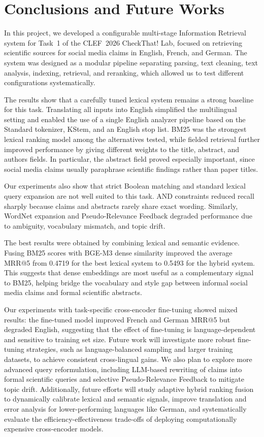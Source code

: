 \section{Conclusions and Future Works}

\label{sec:conclusion}

    In this project, we developed a configurable multi-stage Information Retrieval system for Task~1 of the CLEF~2026 CheckThat! Lab, focused on retrieving scientific sources for social media claims in English, French, and German. The system was designed as a modular pipeline separating parsing, text cleaning, text analysis, indexing, retrieval, and reranking, which allowed us to test different configurations systematically.

    The results show that a carefully tuned lexical system remains a strong baseline for this task. Translating all inputs into English simplified the multilingual setting and enabled the use of a single English analyzer pipeline based on the Standard tokenizer, KStem, and an English stop list. BM25 was the strongest lexical ranking model among the alternatives tested, while fielded retrieval further improved performance by giving different weights to the title, abstract, and authors fields. In particular, the abstract field proved especially important, since social media claims usually paraphrase scientific findings rather than paper titles.

    Our experiments also show that strict Boolean matching and standard lexical query expansion are not well suited to this task. AND constraints reduced recall sharply because claims and abstracts rarely share exact wording. Similarly, WordNet expansion and Pseudo-Relevance Feedback degraded performance due to ambiguity, vocabulary mismatch, and topic drift.

    The best results were obtained by combining lexical and semantic evidence. Fusing BM25 scores with BGE-M3 dense similarity improved the average MRR@5 from 0.4719 for the best lexical system to 0.5493 for the hybrid system. This suggests that dense embeddings are most useful as a complementary signal to BM25, helping bridge the vocabulary and style gap between informal social media claims and formal scientific abstracts.

    Our experiments with task-specific cross-encoder fine-tuning showed mixed results: the fine-tuned model improved French and German MRR@5 but degraded English, suggesting that the effect of fine-tuning is language-dependent and sensitive to training set size. Future work will investigate more robust fine-tuning strategies, such as language-balanced sampling and larger training datasets, to achieve consistent cross-lingual gains. We also plan to explore more advanced query reformulation, including LLM-based rewriting of claims into formal scientific queries and selective Pseudo-Relevance Feedback to mitigate topic drift. Additionally, future efforts will study adaptive hybrid ranking fusion to dynamically calibrate lexical and semantic signals, improve translation and error analysis for lower-performing languages like German, and systematically evaluate the efficiency-effectiveness trade-offs of deploying computationally expensive cross-encoder models.